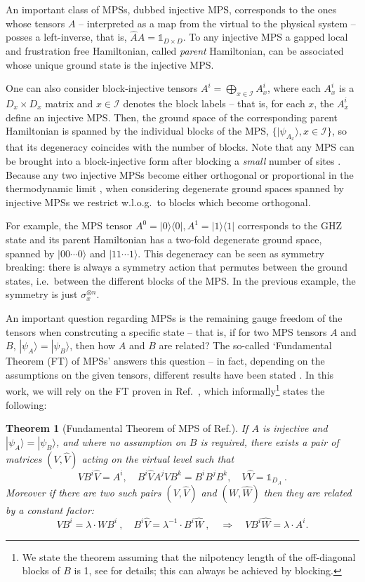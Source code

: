 \documentclass[aps,pra,export,nofootinbib]{revtex4-2}
\newcommand{\id}{\mathbb{1}}
\newtheorem{thm}{Theorem}
\begin{document}
An important class of MPSs, dubbed injective MPS, corresponds to the ones whose tensors $A$ -- interpreted as a map from the virtual to the physical system -- posses a left-inverse, that is, $\hat{A} A = \id_{D\times D}$. To any injective MPS a gapped local and frustration free Hamiltonian, called {\it parent} Hamiltonian, can be associated whose unique ground state is the injective MPS. 

One can also consider block-injective tensors $A^i = \bigoplus_{x \in \mathcal{I} } A^i_x$, where each $A^i_x$ is a $D_x \times D_x$ matrix and $x\in \mathcal{I}$ denotes the block labels -- that is, for each $x$, the $A^i_x$ define an injective MPS. Then, the ground space of the corresponding parent Hamiltonian is spanned by the individual blocks of the MPS, $\{ |\psi_{A_x} \rangle, x \in \mathcal{I} \}$, so that its degeneracy coincides with the number of blocks. Note that any MPS can be brought into a block-injective form \cite{PerezGarcia07} after blocking a {\it small} number of sites \cite{Sanz10}. Because any two injective MPSs become either orthogonal or proportional in the thermodynamic limit \cite{Cirac17A}, when considering degenerate ground spaces spanned by injective MPSs we restrict w.l.o.g.\ to blocks which become orthogonal.


For example, the MPS tensor $A^0=|0\rangle \langle 0|, A^1=|1\rangle \langle 1|$ corresponds to the GHZ state and its parent Hamiltonian has a two-fold degenerate ground space, spanned by $|00\cdots 0\rangle$ and $|11\cdots 1\rangle$. This degeneracy can be seen as symmetry breaking: there is always a symmetry action that permutes between the ground states, i.e.\ between the different blocks of the MPS. In the previous example, the symmetry is just $\sigma_x^{\otimes n}$. 

An important question regarding MPSs is the remaining gauge freedom of the tensors when constrcuting a specific state -- that is, if for two MPS tensors $A$ and $B$, $|\psi_A\rangle = |\psi_B\rangle$, then how $A$ and $B$ are related? The so-called `Fundamental Theorem (FT) of MPSs' answers this question -- in fact, depending on the assumptions on the given tensors, different results have been stated \cite{Cuevas17,Andras18B, Molnar18A}. In this work, we will rely on the FT proven in Ref.~\cite{Andras18B}, which informally\footnote{We state the theorem assuming that the nilpotency length of the off-diagonal blocks of $B$ is 1, see \cite{Andras18B} for details; this can always be achieved by blocking.} states the following:
\begin{thm}[Fundamental Theorem of MPS of Ref.\cite{Andras18B}]\label{FT1}
    If $A$ is injective and $|\psi_A\rangle = |\psi_B\rangle$, and where no assumption on $B$ is required, there exists a pair of matrices $(V,\hat{V})$ acting on the virtual level such that
$$  V B^i \hat{V} = A^i, \quad B^i\hat{V}A^j V B^k = B^iB^jB^k, \quad V\hat{V}=\id_{D_A} \ .$$
Moreover if there are two such pairs $(V,\hat{V})$ and $(W,\hat{W})$ then they are related by a constant factor:
$$V B^i= \lambda \cdot WB^i \ , \quad B^i\hat{V}= \lambda^{-1} \cdot B^i\hat{W} \ ,   \quad \Rightarrow \quad VB^i\hat{W}= \lambda \cdot A^i .$$
\end{thm}
\end{document}

